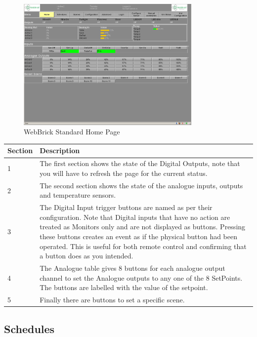 \begin{figure}[H]
\centering
\includegraphics[width=0.8\textwidth]{Images/home.png}
\caption{WebBrick Standard Home Page}
\end{figure}


\begin{tabular}{l|p{12cm}}
Section&Description\\
\hline
1&The first section shows the state of the Digital Outputs, 
note that you will have to refresh the page for the current status.\\

2&The second section shows the state of the analogue inputs, outputs and temperature sensors.\\

3&The Digital Input trigger buttons are named as per their configuration.  Note that Digital inputs that 
have no action are treated as Monitors only and are not displayed as buttons.
Pressing these  buttons creates an event as if the physical button had been
operated.  This is useful for both remote control and confirming that a button does as you intended.\\

4&The Analogue table gives 8 buttons for each analogue output channel to set the Analogue outputs to any one of the 8 SetPoints.
The buttons are labelled with the value of the setpoint.\\

5&Finally there are buttons to set a specific scene.\\
\end{tabular}

\subsection{Schedules}

